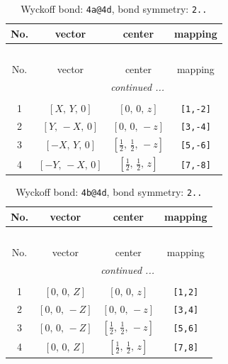 \documentclass[fleqn,8pt]{jsarticle}
\begin{document}
\begin{longtable}{cccc}
\caption{Wyckoff bond: {\tt 4a@4d}, bond symmetry: {\tt 2..}}
 \\
 \hline \hline
No. & vector & center & mapping \\ \hline \endfirsthead

\multicolumn{3}{l}{\tablename\ \thetable{}} \\
 \hline \hline
No. & vector & center & mapping \\ \hline \endhead

 \hline \hline
\multicolumn{3}{r}{\footnotesize\it continued ...} \\ \endfoot

 \hline \hline
\multicolumn{3}{r}{} \\ \endlastfoot

1 & $\left[ X,\, Y,\, 0 \right]$ & $\left[ 0,\, 0,\, z \right]$ & {\tt [1,-2]} \\ \hline
2 & $\left[ Y,\, - X,\, 0 \right]$ & $\left[ 0,\, 0,\, - z \right]$ & {\tt [3,-4]} \\ \hline
3 & $\left[ - X,\, Y,\, 0 \right]$ & $\left[ \frac{1}{2},\, \frac{1}{2},\, - z \right]$ & {\tt [5,-6]} \\ \hline
4 & $\left[ - Y,\, - X,\, 0 \right]$ & $\left[ \frac{1}{2},\, \frac{1}{2},\, z \right]$ & {\tt [7,-8]} \\
\end{longtable}
\renewcommand{\arraystretch}{1.2}
\begin{longtable}{cccc}
\caption{Wyckoff bond: {\tt 4b@4d}, bond symmetry: {\tt 2..}}
 \\
 \hline \hline
No. & vector & center & mapping \\ \hline \endfirsthead

\multicolumn{3}{l}{\tablename\ \thetable{}} \\
 \hline \hline
No. & vector & center & mapping \\ \hline \endhead

 \hline \hline
\multicolumn{3}{r}{\footnotesize\it continued ...} \\ \endfoot

 \hline \hline
\multicolumn{3}{r}{} \\ \endlastfoot

1 & $\left[ 0,\, 0,\, Z \right]$ & $\left[ 0,\, 0,\, z \right]$ & {\tt [1,2]} \\ \hline
2 & $\left[ 0,\, 0,\, - Z \right]$ & $\left[ 0,\, 0,\, - z \right]$ & {\tt [3,4]} \\ \hline
3 & $\left[ 0,\, 0,\, - Z \right]$ & $\left[ \frac{1}{2},\, \frac{1}{2},\, - z \right]$ & {\tt [5,6]} \\ \hline
4 & $\left[ 0,\, 0,\, Z \right]$ & $\left[ \frac{1}{2},\, \frac{1}{2},\, z \right]$ & {\tt [7,8]} \\
\end{longtable}
\end{document}
